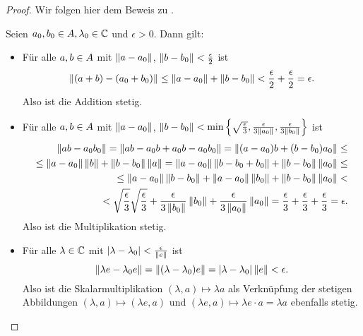 \begin{proof}Wir folgen hier dem Beweis zu \cite[Lemma 2.1.14]{Baer2003}.

Seien $a_0, b_0 \in A, \lambda_0 \in \mathbb{C}$ und $\epsilon > 0$. Dann gilt:
\begin{itemize}
\item Für alle $a,b \in A$ mit $\left\lVert a-a_0\right\rVert$, $\left\lVert b-b_0\right\rVert < \frac{\epsilon}{2}$ ist
		\[\left\lVert(a+b) - (a_0+b_0)\right\rVert \leq \left\lVert a-a_0\right\rVert + \left\lVert b-b_0\right\rVert < \frac{\epsilon}{2} + \frac{\epsilon}{2} = \epsilon.\]
		Also ist die Addition stetig.
		
\item Für alle $a,b \in A$ mit $\left\lVert a-a_0\right\rVert$, $\left\lVert b-b_0\right\rVert < \min\left\lbrace\sqrt{\frac{\epsilon}{3}}, \frac{\epsilon}{3\left\lVert a_0\right\rVert}, \frac{\epsilon}{3\left\lVert b_0\right\rVert}\right\rbrace$ ist
		\begin{align*}
		\left\lVert ab - a_0b_0\right\rVert = \left\lVert ab -a_0b +a_0b -a_0b_0\right\rVert = \left\lVert(a-a_0)b + (b-b_0)a_0\right\rVert \leq \\
		\leq \left\lVert a-a_0\right\rVert\left\lVert b\right\rVert + \left\lVert b-b_0\right\rVert\left\lVert a\right\rVert = \left\lVert a-a_0\right\rVert\left\lVert b-b_0+b_0\right\rVert + \left\lVert b-b_0\right\rVert\left\lVert a_0\right\rVert \leq \\
		\leq \left\lVert a-a_0\right\rVert\left\lVert b-b_0\right\rVert + \left\lVert a-a_0\right\rVert\left\lVert b_0\right\rVert + \left\lVert b-b_0\right\rVert\left\lVert a_0\right\rVert < \\
		< \sqrt{\frac{\epsilon}{3}} \sqrt{\frac{\epsilon}{3}} + \frac{\epsilon}{3\left\lVert b_0\right\rVert}\left\lVert b_0\right\rVert + \frac{\epsilon}{3\left\lVert a_0\right\rVert}\left\lVert a_0\right\rVert = \frac{\epsilon}{3} + \frac{\epsilon}{3} + \frac{\epsilon}{3} = \epsilon.		
		\end{align*}
		Also ist die Multiplikation stetig.
		
\item Für alle $\lambda \in \mathbb{C}$ mit $|\lambda - \lambda_0| < \frac{\epsilon}{\left\lVert e\right\rVert}$ ist
		\[\left\lVert\lambda e - \lambda_0 e\right\rVert = \left\lVert(\lambda-\lambda_0)e\right\rVert = |\lambda - \lambda_0| \left\lVert e\right\rVert < \epsilon.\]
		Also ist die Skalarmultiplikation $(\lambda,a) \mapsto \lambda a$ als Verknüpfung der stetigen Abbildungen $(\lambda,a) \mapsto (\lambda e,a)$ und $(\lambda e, a) \mapsto \lambda e \cdot a = \lambda a$ ebenfalls stetig.
		

\end{itemize}
\end{proof}
